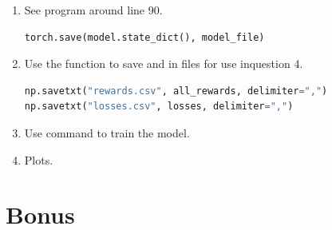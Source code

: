 \documentclass[12pt]{article}
\newcommand{\1}{\mathds{1}}
\newcommand{\<}{\langle}
\renewcommand{\>}{\rangle}
\begin{document}
\begin{enumerate}
    \item See program  around line 90.

\begin{lstlisting}[language=Python]
torch.save(model.state_dict(), model_file)
\end{lstlisting}

    \item Use the  function to 
        save  and 
        in  files for use inquestion 4.

\begin{lstlisting}[language=Python]
np.savetxt("rewards.csv", all_rewards, delimiter=",")
np.savetxt("losses.csv", losses, delimiter=",")
\end{lstlisting}


    \item Use command  to train the model.
    \item Plots.
    
    \begin{figure}[h]
    \end{figure}

\end{enumerate}


\newpage
\section{Bonus}
\end{document}
